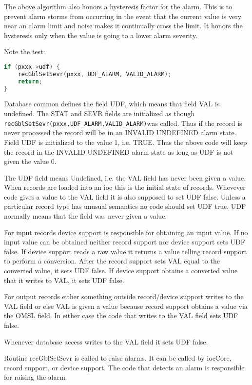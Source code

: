 The above algorithm also honors a hysteresis factor for the alarm.
This is to prevent alarm storms from occurring in the event that the current value is very near an alarm limit and noise makes it continually cross the limit.
It honors the hysteresis only when the value is going to a lower alarm severity.

Note the test:

\begin{lstlisting}[language=C]
if (pxxx->udf) {
    recGblSetSevr(pxxx, UDF_ALARM, VALID_ALARM);
    return;
}
\end{lstlisting}

Database common defines the field UDF, which means that field VAL is undefined.
The STAT and SEVR fields are initialized as though \verb|recGblSetSevr(pxxx,UDF_ALARM,VALID_ALARM)|was called.
Thus if the record is never processed the record will be in an INVALID UNDEFINED alarm state.
Field UDF is initialized to the value 1, i.e. TRUE.
Thus the above code will keep the record in the INVALID UNDEFINED alarm state as long as UDF is not given the value 0.

The UDF field means Undefined, i.e. the VAL field has never been given a value.
When records are loaded into an ioc this is the initial state of records.
Whevever code gives a value to the VAL field it is also supposed to set UDF false.
Unless a particular record type has unusual semantics no code should set UDF true.
UDF normally means that the field was never given a value.

For input records device support is responsible for obtaining an input value.
If no input value can be obtained neither record support nor device support sets UDF false.
If device support reads a raw value it returns a value telling record support to perform a conversion.
After the record support sets VAL equal to the converted value, it sets UDF false.
If device support obtains a converted value that it writes to VAL, it sets UDF false.

For output records either something outside record/device support writes to the VAL field or else VAL is given a value because record support obtains a value via the OMSL field.
In either case the code that writes to the VAL field sets UDF false.

Whenever database access writes to the VAL field it sets UDF false.

Routine recGblSetSevr is called to raise alarms.
It can be called by iocCore, record support, or device support.
The code that detects an alarm is responsible for raising the alarm.

